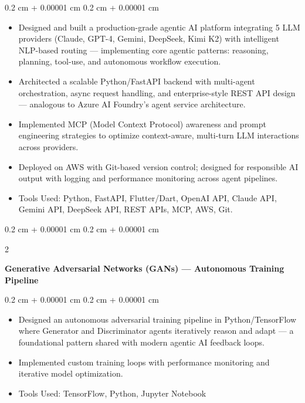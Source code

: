 \documentclass[10pt, letterpaper]{article}
\newenvironment{highlights}{
    \begin{itemize}[
        topsep=0.10 cm,
        parsep=0.10 cm,
        partopsep=0pt,
        itemsep=0pt,
        leftmargin=0.4 cm + 10pt
    ]
}{
    \end{itemize}
}
\newenvironment{onecolentry}{
    \begin{adjustwidth}{
        0.2 cm + 0.00001 cm
    }{
        0.2 cm + 0.00001 cm
    }
}{
    \end{adjustwidth}
}
\newenvironment{twocolentry}[2][]{
    \onecolentry
    \def\secondColumn{#2}
    \setcolumnwidth{\fill, 4.5 cm}
    \begin{paracol}{2}
}{
    \switchcolumn \raggedleft \secondColumn
    \end{paracol}
    \endonecolentry
}
\let\hrefWithoutArrow\href
\renewcommand{\href}[2]{\hrefWithoutArrow{#1}{\ifthenelse{\equal{#2}{}}{ }{#2 }\raisebox{.15ex}{\footnotesize \faExternalLink*}}}
\begin{document}
        \vspace{0.10 cm}
        \begin{onecolentry}
            \begin{highlights}
                \item Designed and built a production-grade agentic AI platform integrating 5 LLM providers (Claude, GPT-4, Gemini, DeepSeek, Kimi K2) with intelligent NLP-based routing — implementing core agentic patterns: reasoning, planning, tool-use, and autonomous workflow execution.
                \item Architected a scalable Python/FastAPI backend with multi-agent orchestration, async request handling, and enterprise-style REST API design — analogous to Azure AI Foundry's agent service architecture.
                \item Implemented MCP (Model Context Protocol) awareness and prompt engineering strategies to optimize context-aware, multi-turn LLM interactions across providers.
                \item Deployed on AWS with Git-based version control; designed for responsible AI output with logging and performance monitoring across agent pipelines.
                \item Tools Used: Python, FastAPI, Flutter/Dart, OpenAI API, Claude API, Gemini API, DeepSeek API, REST APIs, MCP, AWS, Git.
            \end{highlights}
        \end{onecolentry}

        \vspace{0.2 cm}

        \begin{twocolentry}{
            \textit{\href{https://GitHub.com/yashpalsince2004/Generative-Adversarial-Networks-GANs-with-TensorFlow.git}{GAN}}}
            \textbf{Generative Adversarial Networks (GANs) — Autonomous Training Pipeline}
        \end{twocolentry}

        \vspace{0.10 cm}
        \begin{onecolentry}
            \begin{highlights}
                \item Designed an autonomous adversarial training pipeline in Python/TensorFlow where Generator and Discriminator agents iteratively reason and adapt — a foundational pattern shared with modern agentic AI feedback loops.
                \item Implemented custom training loops with performance monitoring and iterative model optimization.
                \item Tools Used: TensorFlow, Python, Jupyter Notebook
            \end{highlights}
        \end{onecolentry}
\end{document}
